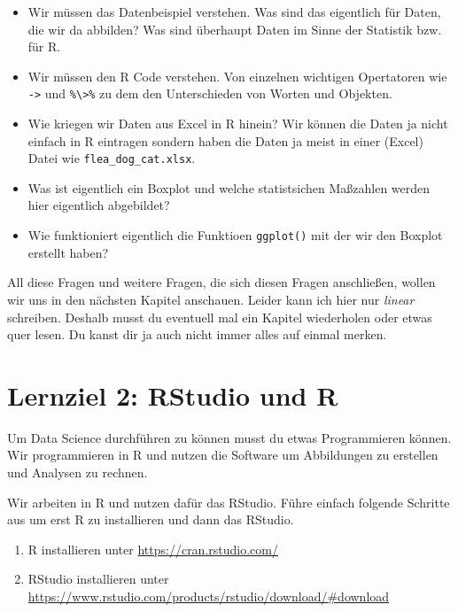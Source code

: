 \documentclass[
  letterpaper,
  DIV=11,
  oneside]{scrreport}
\providecommand{\tightlist}{%
  \setlength{\itemsep}{0pt}\setlength{\parskip}{0pt}}\usepackage{longtable,booktabs,array}
\begin{document}
\begin{itemize}
\tightlist
\item
  Wir müssen das Datenbeispiel verstehen. Was sind das eigentlich für
  Daten, die wir da abbilden? Was sind überhaupt Daten im Sinne der
  Statistik bzw. für R.
\item
  Wir müssen den R Code verstehen. Von einzelnen wichtigen Opertatoren
  wie \texttt{-\textgreater{}} und
  \texttt{\%\textbackslash{}\textgreater{}\%} zu dem den Unterschieden
  von Worten und Objekten.
\item
  Wie kriegen wir Daten aus Excel in R hinein? Wir können die Daten ja
  nicht einfach in R eintragen sondern haben die Daten ja meist in einer
  (Excel) Datei wie \texttt{flea\_dog\_cat.xlsx}.
\item
  Was ist eigentlich ein Boxplot und welche statistsichen Maßzahlen
  werden hier eigentlich abgebildet?
\item
  Wie funktioniert eigentlich die Funktioen \texttt{ggplot()} mit der
  wir den Boxplot erstellt haben?
\end{itemize}

All diese Fragen und weitere Fragen, die sich diesen Fragen anschließen,
wollen wir uns in den nächsten Kapitel anschauen. Leider kann ich hier
nur \emph{linear} schreiben. Deshalb musst du eventuell mal ein Kapitel
wiederholen oder etwas quer lesen. Du kanst dir ja auch nicht immer
alles auf einmal merken.

\hypertarget{lernziel-2-rstudio-und-r}{%
\section{Lernziel 2: RStudio und R}\label{lernziel-2-rstudio-und-r}}

Um Data Science durchführen zu können musst du etwas Programmieren
können. Wir programmieren in R und nutzen die Software um Abbildungen zu
erstellen und Analysen zu rechnen.

Wir arbeiten in R und nutzen dafür das RStudio. Führe einfach folgende
Schritte aus um erst R zu installieren und dann das RStudio.

\begin{enumerate}
\def\labelenumi{\arabic{enumi}.}
\tightlist
\item
  R installieren unter \url{https://cran.rstudio.com/}
\item
  RStudio installieren unter
  \url{https://www.rstudio.com/products/rstudio/download/\#download}
\end{enumerate}
\end{document}
